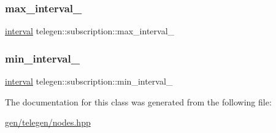 \mbox{\label{classtelegen_1_1subscription_afbf8aaf4fdfd91ef0f210ade501c04b1}} 
\subsubsection{\texorpdfstring{max\+\_\+interval\+\_\+}{max\_interval\_}}
{\footnotesize\ttfamily \hyperlink{namespacetelegen_ad925de2d0a99bc43918533abf0457344}{interval} telegen\+::subscription\+::max\+\_\+interval\+\_\+\hspace{0.3cm}{\ttfamily [protected]}}

\mbox{\label{classtelegen_1_1subscription_a6aee0684ec18cb68e68c7110742dc625}} 
\subsubsection{\texorpdfstring{min\+\_\+interval\+\_\+}{min\_interval\_}}
{\footnotesize\ttfamily \hyperlink{namespacetelegen_ad925de2d0a99bc43918533abf0457344}{interval} telegen\+::subscription\+::min\+\_\+interval\+\_\+\hspace{0.3cm}{\ttfamily [protected]}}



The documentation for this class was generated from the following file\+:\begin{DoxyCompactItemize}
\item 
\hyperlink{gen_2telegen_2nodes_8hpp}{gen/telegen/nodes.\+hpp}\end{DoxyCompactItemize}
